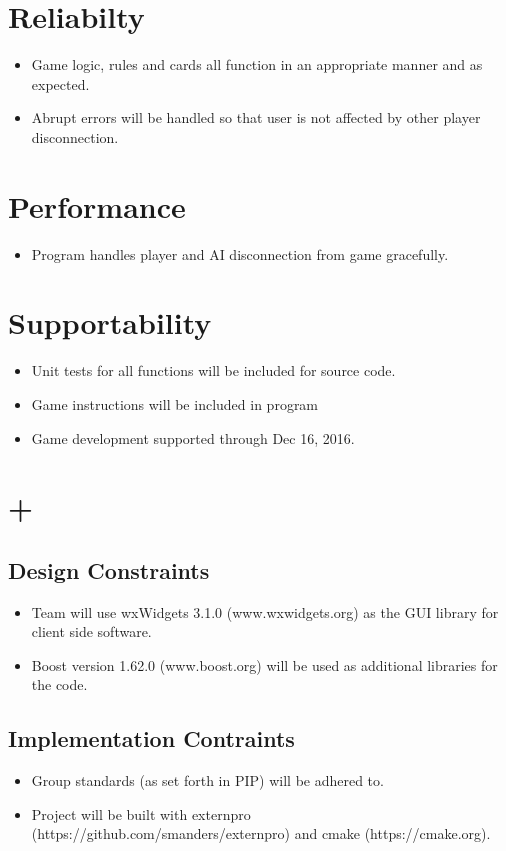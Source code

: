 \documentclass[11pt, titlepage]{article}
\begin{document}
	\section{Reliabilty}
		\begin{itemize}
			\item Game logic, rules and cards all function in an appropriate manner and as expected.
			\item Abrupt errors will be handled so that user is not affected by other player disconnection.
		\end{itemize}
	\section{Performance}
	\begin{itemize}
		\item Program handles player and AI disconnection from game gracefully.
	\end{itemize}
	\section{Supportability}
		\begin{itemize}
			\item Unit tests for all functions will be included for source code.
			\item Game instructions will be included in program
			\item Game development supported through Dec 16, 2016.
		\end{itemize}
	\section{+}
		\subsection{Design Constraints}
			\begin{itemize}
				\item Team will use wxWidgets 3.1.0 (www.wxwidgets.org) as the GUI library for client side software.
				\item Boost version 1.62.0 (www.boost.org) will be used as additional libraries for the code.
			\end{itemize}			
		\subsection{Implementation Contraints}
			\begin{itemize}
				\item Group standards (as set forth in PIP) will be adhered to.
				\item Project will be built with externpro (https://github.com/smanders/externpro) and cmake (https://cmake.org).
			\end{itemize}
\end{document}
